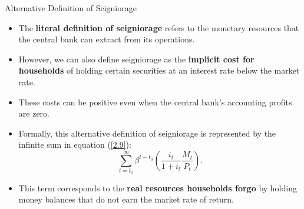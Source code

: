 \documentclass[11pt,aspectratio=169]{beamer}
\begin{document}
\begin{frame}{Alternative Definition of Seigniorage}
\small
\begin{itemize}

    \item The \textbf{literal definition of seigniorage} refers to the monetary resources that the central bank can extract from its operations.

    \vspace{0.3em}

    \item However, we can also define seigniorage as the \textbf{implicit cost for households} of holding certain securities at an interest rate below the market rate.

    \vspace{0.3em}

    \item These costs can be positive even when the central bank’s accounting profits are zero.

    \vspace{0.3em}

    \item Formally, this alternative definition of seigniorage is represented by the infinite sum in equation (\ref{2.9}):
    \begin{equation*}
        \sum_{t=t_0}^{\infty} \beta^{t-t_0}
        \left( \frac{i_t}{1+i_t}\frac{M_t}{P_t} \right).
    \end{equation*}

    \vspace{0.3em}

    \item This term corresponds to the \textbf{real resources households forgo} by holding money balances that do not earn the market rate of return.
\end{itemize}

\end{frame}
\end{document}
